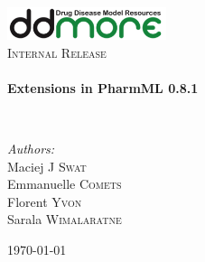 \begin{titlepage}
\begin{center}

\includegraphics[width=0.35\textwidth]{./logo/ddmore_logo}~\\[1cm]

%
\textsc{\Large Internal Release}\\[0.5cm]

\HRule \\[0.4cm]
{ \huge \bfseries Extensions in PharmML 0.8.1 \\[0.4cm] }

\HRule \\[1.5cm]

\begin{minipage}{0.5\textwidth}
\begin{flushleft} \large
\emph{Authors:}\\
Maciej J \textsc{Swat}\\
Emmanuelle \textsc{Comets}\\
Florent \textsc{Yvon}\\
Sarala \textsc{Wimalaratne}\\
\end{flushleft}
\end{minipage}
\begin{minipage}{0.4\textwidth}
\end{minipage}

\vfill



\vfill

{\large \today \\}

\end{center}
\end{titlepage}